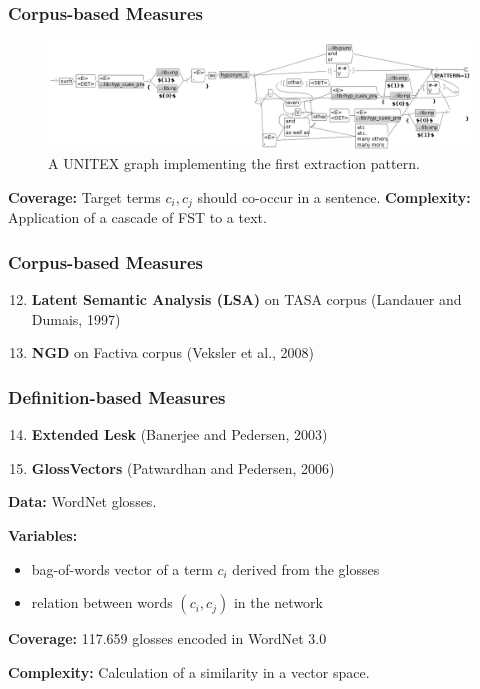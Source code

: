\documentclass{beamer}
\begin{document}
 \begin{frame}
\frametitle{Corpus-based Measures}
	
 \begin{figure}
        \includegraphics[width=1.0\textwidth]{figures/hypernym_1}
        \caption{A UNITEX graph implementing the first extraction pattern.}
        \label{fig:prcomb}
\end{figure}

\textbf{Coverage:} Target terms $c_i, c_j$ should co-occur in a sentence.
\textbf{Complexity:} Application of a cascade of FST to a text.
	
\end{frame}

\begin{frame}
\frametitle{Corpus-based Measures }

\begin{enumerate}
   \setcounter{enumi}{11}
	\item \textbf{Latent Semantic Analysis (LSA)} on TASA corpus (Landauer and Dumais, 1997)
	\item \textbf{NGD} on Factiva corpus (Veksler et al., 2008)
\end{enumerate}
	
\end{frame}

\begin{frame}
\frametitle{Definition-based Measures}

\begin{enumerate}
  \setcounter{enumi}{13}
  \item \textbf{Extended Lesk}  (Banerjee and Pedersen, 2003)
  \item \textbf{GlossVectors} (Patwardhan and Pedersen, 2006)
\end{enumerate}


\textbf{Data:} WordNet glosses.
	
\textbf{Variables:}
\begin{itemize}
		\item bag-of-words vector of a term $c_i$ derived from the glosses
		\item relation  between words $(c_i,c_j)$ in the network 
\end{itemize}

\textbf{Coverage:} 117.659 glosses encoded in WordNet 3.0

\textbf{Complexity:} Calculation of a similarity in a vector space.

\end{frame}
\end{document}
